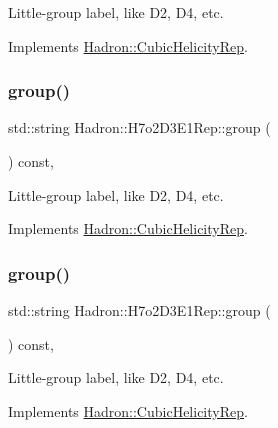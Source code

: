 Little-\/group label, like D2, D4, etc. 

Implements \mbox{\hyperlink{structHadron_1_1CubicHelicityRep_a101a7d76cd8ccdad0f272db44b766113}{Hadron\+::\+Cubic\+Helicity\+Rep}}.

\mbox{\label{structHadron_1_1H7o2D3E1Rep_a9a25c1c49d874a36ad6a3c82522d0482}} 
\subsubsection{\texorpdfstring{group()}{group()}\hspace{0.1cm}{\footnotesize\ttfamily [3/5]}}
{\footnotesize\ttfamily std\+::string Hadron\+::\+H7o2\+D3\+E1\+Rep\+::group (\begin{DoxyParamCaption}{ }\end{DoxyParamCaption}) const\hspace{0.3cm}{\ttfamily [inline]}, {\ttfamily [virtual]}}

Little-\/group label, like D2, D4, etc. 

Implements \mbox{\hyperlink{structHadron_1_1CubicHelicityRep_a101a7d76cd8ccdad0f272db44b766113}{Hadron\+::\+Cubic\+Helicity\+Rep}}.

\mbox{\label{structHadron_1_1H7o2D3E1Rep_a9a25c1c49d874a36ad6a3c82522d0482}} 
\subsubsection{\texorpdfstring{group()}{group()}\hspace{0.1cm}{\footnotesize\ttfamily [4/5]}}
{\footnotesize\ttfamily std\+::string Hadron\+::\+H7o2\+D3\+E1\+Rep\+::group (\begin{DoxyParamCaption}{ }\end{DoxyParamCaption}) const\hspace{0.3cm}{\ttfamily [inline]}, {\ttfamily [virtual]}}

Little-\/group label, like D2, D4, etc. 

Implements \mbox{\hyperlink{structHadron_1_1CubicHelicityRep_a101a7d76cd8ccdad0f272db44b766113}{Hadron\+::\+Cubic\+Helicity\+Rep}}.

